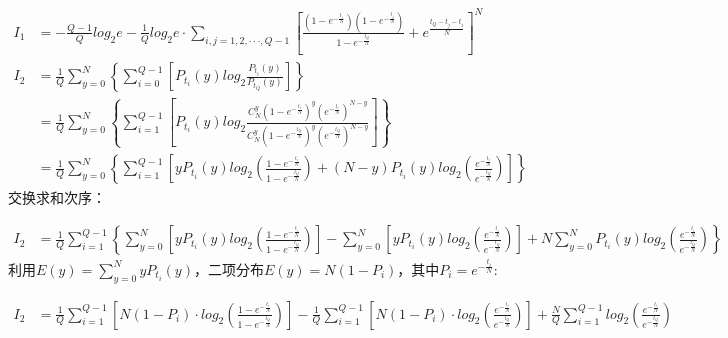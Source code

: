 \documentclass[12pt]{article}
\begin{document}
\begin{equation*}
  \begin{aligned}
    I_1 &= -\frac{Q-1}{Q}log_2e-\frac{1}{Q}log_2e·\sum_{i,j=1,2,···,Q-1}\left[\frac{\left(1-e^{-\frac{t_i}{N}}\right)\left(1-e^{-\frac{t_j}{N}}\right)}{1-e^{-\frac{t_Q}{N}}}+e^{\frac{t_Q-t_j-t_i}{N}}\right]^N \\
    I_2 &= \frac{1}{Q}\sum\limits_{y=0}^N\left\{\sum\limits_{i=0}^{Q-1}\left[P_{t_i}(y)log_2\frac{P_{t_i}(y)}{P_{t_Q}(y)}\right]\right\} \\
    &= \frac{1}{Q}\sum\limits_{y=0}^N\left\{\sum\limits_{i=1}^{Q-1}\left[P_{t_i}(y)log_2\frac{C_N^y\left(1-e^{-\frac{t_i}{N}}\right)^y\left(e^{-\frac{t_i}{N}}\right)^{N-y}}{C_N^y\left(1-e^{-\frac{t_Q}{N}}\right)^y\left(e^{-\frac{t_Q}{N}}\right)^{N-y}}\right]\right\} \\
    &= \frac{1}{Q}\sum\limits_{y=0}^N\left\{\sum\limits_{i=1}^{Q-1}\left[yP_{t_i}(y)log_2\left(\frac{1-e^{-\frac{t_i}{N}}}{1-e^{-\frac{t_Q}{N}}}\right)+(N-y)P_{t_i}(y)log_2\left(\frac{e^{-\frac{t_i}{N}}}{e^{-\frac{t_Q}{N}}}\right)\right]\right\}
  \end{aligned}
\end{equation*}
交换求和次序：\par
\begin{equation*}
  \begin{aligned}
    I_2 &= \frac{1}{Q}\sum\limits_{i=1}^{Q-1}\left\{\sum\limits_{y=0}^N\left[yP_{t_i}(y)log_2\left(\frac{1-e^{-\frac{t_i}{N}}}{1-e^{-\frac{t_Q}{N}}}\right)\right] - \sum\limits_{y=0}^N\left[yP_{t_i}(y)log_2\left(\frac{e^{-\frac{t_i}{N}}}{e^{-\frac{t_Q}{N}}}\right)\right] +N\sum\limits_{y=0}^NP_{t_i}(y)log_2\left(\frac{e^{-\frac{t_i}{N}}}{e^{-\frac{t_Q}{N}}}\right) \right\}
  \end{aligned}
\end{equation*}
利用$E(y)=\sum\limits_{y=0}^NyP_{t_i}(y)$，二项分布$E(y)=N(1-P_i)$，其中$P_i=e^{-\frac{t_i}{N}}$:\par
\begin{equation*}
  \begin{aligned}
    I_2 &= \frac{1}{Q}\sum\limits_{i=1}^{Q-1}\left[N(1-P_i)·log_2\left(\frac{1-e^{-\frac{t_i}{N}}}{1-e^{-\frac{t_Q}{N}}}\right)\right]-\frac{1}{Q}\sum\limits_{i=1}^{Q-1}\left[N(1-P_i)·log_2\left(\frac{e^{-\frac{t_i}{N}}}{e^{-\frac{t_Q}{N}}}\right)\right]+\frac{N}{Q}\sum\limits_{i=1}^{Q-1}log_2\left(\frac{e^{-\frac{t_i}{N}}}{e^{-\frac{t_Q}{N}}}\right)
  \end{aligned}
\end{equation*}
\end{document}
